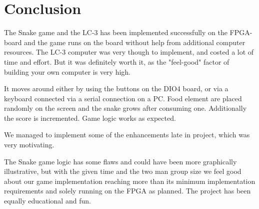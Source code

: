 \documentclass{acm_proc_article-sp}
\begin{document}
\section{Conclusion}
The Snake game and the LC-3 has been implemented successfully on the FPGA-board and the game runs on the board without help from additional computer resources. 
The LC-3 computer was very though to implement, and costed a lot of time and effort. But it was definitely worth it, as the "feel-good" factor of building your own computer is very high.

It moves around either by using the buttons on the DIO4 board, or via a keyboard connected via a serial connection on a PC.
Food element are placed randomly on the screen and the snake grows after consuming one. Additionally the score is incremented. Game logic works as expected.

We managed to implement some of the enhancements late in project, which was very motivating.

The Snake game logic has some flaws and could have been more graphically illustrative, but with the given time and the two man group size we feel good about our game implementation reaching more than its minimum implementation requirements and solely running on the FPGA as planned. The project has been equally educational and fun.




\appendix


%
%
\end{document}
